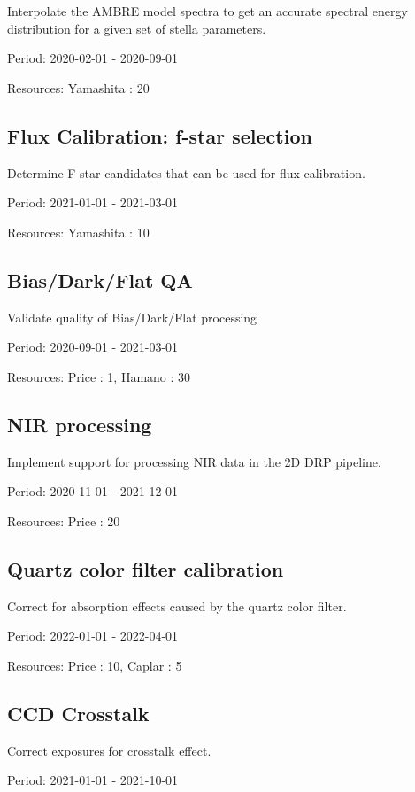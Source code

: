 Interpolate the AMBRE model spectra to get an accurate spectral energy distribution for a given set of stella parameters.

Period: 2020-02-01 - 2020-09-01

Resources: Yamashita : 20

\subsection{Flux Calibration: f-star selection}

Determine F-star candidates that can be used for flux calibration.

Period: 2021-01-01 - 2021-03-01

Resources: Yamashita : 10

\subsection{Bias/Dark/Flat QA}

Validate quality of Bias/Dark/Flat processing

Period: 2020-09-01 - 2021-03-01

Resources: Price : 1, Hamano : 30

\subsection{NIR processing}

Implement support for processing NIR data in the 2D DRP pipeline.

Period: 2020-11-01 - 2021-12-01

Resources: Price : 20

\subsection{Quartz color filter calibration}

Correct for absorption effects caused by the quartz color filter.

Period: 2022-01-01 - 2022-04-01

Resources: Price : 10, Caplar : 5

\subsection{CCD Crosstalk}

Correct exposures for crosstalk effect.

Period: 2021-01-01 - 2021-10-01

